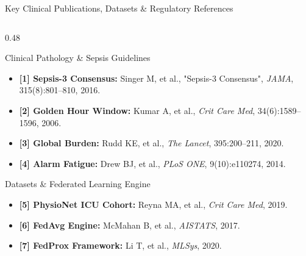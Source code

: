 \documentclass[aspectratio=169, 11pt]{beamer}
\begin{document}
\begin{frame}{Key Clinical Publications, Datasets \& Regulatory References}
    \begin{columns}[t]
        \begin{column}{0.48\textwidth}
            \begin{block}{\textcolor{neonCyan}{Clinical Pathology \& Sepsis Guidelines}}
                \tiny
                \begin{itemize}
                    \item \textbf{[1] Sepsis-3 Consensus:} Singer M, et al., "Sepsis-3 Consensus", \textit{JAMA}, 315(8):801--810, 2016.
                    \item \textbf{[2] Golden Hour Window:} Kumar A, et al., \textit{Crit Care Med}, 34(6):1589--1596, 2006.
                    \item \textbf{[3] Global Burden:} Rudd KE, et al., \textit{The Lancet}, 395:200--211, 2020.
                    \item \textbf{[4] Alarm Fatigue:} Drew BJ, et al., \textit{PLoS ONE}, 9(10):e110274, 2014.
                \end{itemize}
            \end{block}
            
            \begin{block}{\textcolor{neonTeal}{Datasets \& Federated Learning Engine}}
                \tiny
                \begin{itemize}
                    \item \textbf{[5] PhysioNet ICU Cohort:} Reyna MA, et al., \textit{Crit Care Med}, 2019.
                    \item \textbf{[6] FedAvg Engine:} McMahan B, et al., \textit{AISTATS}, 2017.
                    \item \textbf{[7] FedProx Framework:} Li T, et al., \textit{MLSys}, 2020.
                \end{itemize}
            \end{block}
        \end{column}
        

\end{columns}
\end{frame}
\end{document}
